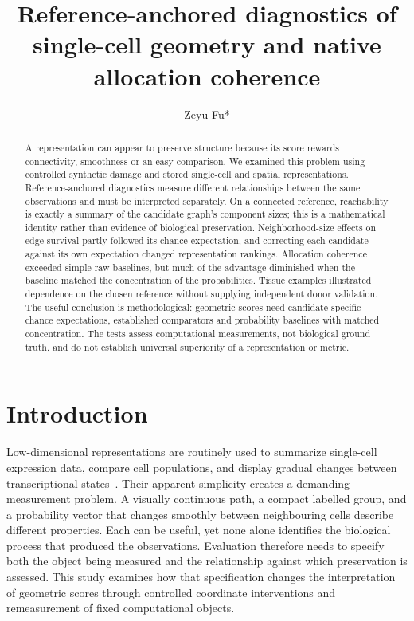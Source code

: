 \documentclass[11pt]{article}
\title{Reference-anchored diagnostics of single-cell geometry and native allocation coherence}
\author[1]{Zeyu Fu*}
\affil[1]{\hspace{0.2em}State Key Laboratory of Trauma and Chemical Poisoning, Institute of Combined Injury,
Chongqing Engineering Research Center for Nanomedicine, College of Preventive Medicine,
Army Medical University, Chongqing, China\\\texttt{fuzeyu09@gmail.com}}
\date{}
\begin{document}
\maketitle
\modulolinenumbers[5]\linenumbers

\begin{abstract}
A representation can appear to preserve structure because its score rewards connectivity, smoothness or an easy comparison. We examined this problem using controlled synthetic damage and stored single-cell and spatial representations. Reference-anchored diagnostics measure different relationships between the same observations and must be interpreted separately. On a connected reference, reachability is exactly a summary of the candidate graph's component sizes; this is a mathematical identity rather than evidence of biological preservation. Neighborhood-size effects on edge survival partly followed its chance expectation, and correcting each candidate against its own expectation changed representation rankings. Allocation coherence exceeded simple raw baselines, but much of the advantage diminished when the baseline matched the concentration of the probabilities. Tissue examples illustrated dependence on the chosen reference without supplying independent donor validation. The useful conclusion is methodological: geometric scores need candidate-specific chance expectations, established comparators and probability baselines with matched concentration. The tests assess computational measurements, not biological ground truth, and do not establish universal superiority of a representation or metric.
\end{abstract}

\section{Introduction}

Low-dimensional representations are routinely used to summarize single-cell expression data, compare cell populations, and display gradual changes between transcriptional states~\cite{luecken2019practices,becht2019umap}. Their apparent simplicity creates a demanding measurement problem. A visually continuous path, a compact labelled group, and a probability vector that changes smoothly between neighbouring cells describe different properties. Each can be useful, yet none alone identifies the biological process that produced the observations. Evaluation therefore needs to specify both the object being measured and the relationship against which preservation is assessed. This study examines how that specification changes the interpretation of geometric scores through controlled coordinate interventions and remeasurement of fixed computational objects.
\end{document}
